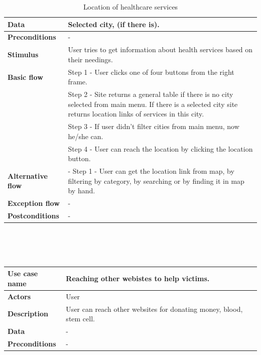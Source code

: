 \begin{center}
\begin{table}[H]
\begin{tabular}{| m{3cm}| m{10cm} |}
            \hline
            \textbf{Data} & Selected city, (if there is).\\
            \hline
            \textbf{Preconditions} & - \\
            \hline
            \textbf{Stimulus} & User tries to get information about health services based on their needings. \\
            \hline
            \textbf{Basic flow} & Step 1 - User clicks one of four buttons from the right frame.\\
                                & Step 2 - Site returns a general table if there is no city selected from main menu. If there is a selected city site returns location links of services in this city.\\
                                & Step 3 - If user didn't filter cities from main menu, now he/she can.\\
                                & Step 4 - User can reach the location by clicking the location button. \\
            \hline
            \textbf{Alternative flow} & - Step 1 - User can get the location link from map, by filtering by category, by searching or by finding it in map by hand.\\
            \hline
            \textbf{Exception flow} &  -\\
            \hline
            \textbf{Postconditions} & -\\
            \hline
        \end{tabular}
        \caption[Location of healthcare services]{Location of healthcare services}
    \end{table}
    ~\\~\\~\\
    \begin{table}[H]
        \begin{tabular}{| m{3cm}| m{10cm} |}
            \hline
            \textbf{Use case name} & Reaching other webistes to help victims.  \\
            \hline
            \textbf{Actors} & User\\
            \hline
            \textbf{Description} & User can reach other websites for donating money, blood, stem cell.\\
            \hline
            \textbf{Data} & -\\
            \hline
            \textbf{Preconditions} &  -\\

\end{tabular}
\end{table}
\end{center}

